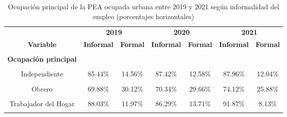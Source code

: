 \documentclass[
  letterpaper,
  12pt,
  oneside,
  spanish,
  doublespacing,
  headsepline,
  parskip]{MastersDoctoralThesis}
\begin{document}
\hypertarget{tbl-ocupi}{}
\begin{table}[H]
\caption{\label{tbl-ocupi}Ocupación principal de la PEA ocupada urbana entre 2019 y 2021 según
informalidad del empleo (porcentajes horizontales) }\tabularnewline

\centering\begingroup\fontsize{10}{12}\selectfont

\begin{tabular}{ccccccc}
\toprule
\multicolumn{1}{c}{ } & \multicolumn{2}{c}{\textbf{2019}} & \multicolumn{2}{c}{\textbf{2020}} & \multicolumn{2}{c}{\textbf{2021}} \\
\cmidrule(l{3pt}r{3pt}){2-3} \cmidrule(l{3pt}r{3pt}){4-5} \cmidrule(l{3pt}r{3pt}){6-7}
\textbf{Variable} & \textbf{Informal} & \textbf{Formal} & \textbf{Informal} & \textbf{Formal} & \textbf{Informal} & \textbf{Formal}\\
\midrule
\cellcolor{gray!6}{\textbf{Nacional}} & \cellcolor{gray!6}{66.40\%} & \cellcolor{gray!6}{33.60\%} & \cellcolor{gray!6}{68.42\%} & \cellcolor{gray!6}{31.58\%} & \cellcolor{gray!6}{71.41\%} & \cellcolor{gray!6}{28.59\%}\\
\textbf{Ocupación principal} &  &  &  &  &  & \\
\cellcolor{gray!6}{Empleador} & \cellcolor{gray!6}{45.73\%} & \cellcolor{gray!6}{54.27\%} & \cellcolor{gray!6}{47.22\%} & \cellcolor{gray!6}{52.78\%} & \cellcolor{gray!6}{50.81\%} & \cellcolor{gray!6}{49.19\%}\\
Independiente & 85.44\% & 14.56\% & 87.42\% & 12.58\% & 87.96\% & 12.04\%\\
\cellcolor{gray!6}{Empleado} & \cellcolor{gray!6}{36.68\%} & \cellcolor{gray!6}{63.32\%} & \cellcolor{gray!6}{34.02\%} & \cellcolor{gray!6}{65.98\%} & \cellcolor{gray!6}{39.84\%} & \cellcolor{gray!6}{60.16\%}\\
\addlinespace
Obrero & 69.88\% & 30.12\% & 70.34\% & 29.66\% & 74.12\% & 25.88\%\\
\cellcolor{gray!6}{Familiar No Remunerado} & \cellcolor{gray!6}{100.00\%} & \cellcolor{gray!6}{0.00\%} & \cellcolor{gray!6}{100.00\%} & \cellcolor{gray!6}{0.00\%} & \cellcolor{gray!6}{100.00\%} & \cellcolor{gray!6}{0.00\%}\\
Trabajador del Hogar & 88.03\% & 11.97\% & 86.29\% & 13.71\% & 91.87\% & 8.13\%\\
\cellcolor{gray!6}{Otro} & \cellcolor{gray!6}{100.00\%} & \cellcolor{gray!6}{0.00\%} & \cellcolor{gray!6}{100.00\%} & \cellcolor{gray!6}{0.00\%} & \cellcolor{gray!6}{100.00\%} & \cellcolor{gray!6}{0.00\%}\\
\bottomrule
\end{tabular}
\endgroup{}
\end{table}
\end{document}
